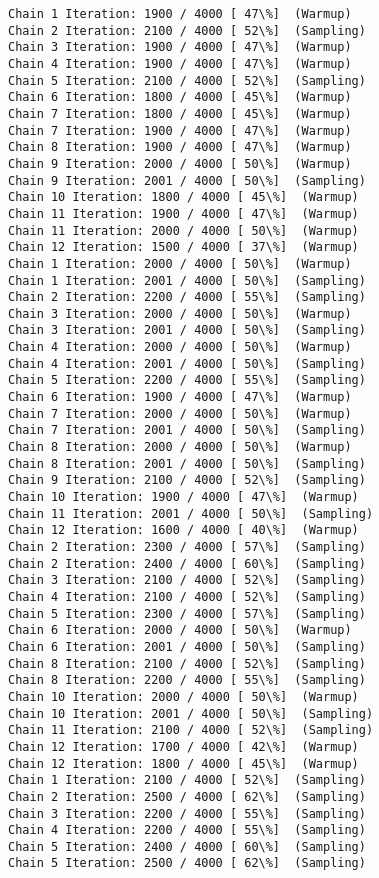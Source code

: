 \documentclass[11pt]{article}
\begin{document}
\begin{Verbatim}[commandchars=\\\{\}]
Chain 1 Iteration: 1900 / 4000 [ 47\%]  (Warmup)
Chain 2 Iteration: 2100 / 4000 [ 52\%]  (Sampling)
Chain 3 Iteration: 1900 / 4000 [ 47\%]  (Warmup)
Chain 4 Iteration: 1900 / 4000 [ 47\%]  (Warmup)
Chain 5 Iteration: 2100 / 4000 [ 52\%]  (Sampling)
Chain 6 Iteration: 1800 / 4000 [ 45\%]  (Warmup)
Chain 7 Iteration: 1800 / 4000 [ 45\%]  (Warmup)
Chain 7 Iteration: 1900 / 4000 [ 47\%]  (Warmup)
Chain 8 Iteration: 1900 / 4000 [ 47\%]  (Warmup)
Chain 9 Iteration: 2000 / 4000 [ 50\%]  (Warmup)
Chain 9 Iteration: 2001 / 4000 [ 50\%]  (Sampling)
Chain 10 Iteration: 1800 / 4000 [ 45\%]  (Warmup)
Chain 11 Iteration: 1900 / 4000 [ 47\%]  (Warmup)
Chain 11 Iteration: 2000 / 4000 [ 50\%]  (Warmup)
Chain 12 Iteration: 1500 / 4000 [ 37\%]  (Warmup)
Chain 1 Iteration: 2000 / 4000 [ 50\%]  (Warmup)
Chain 1 Iteration: 2001 / 4000 [ 50\%]  (Sampling)
Chain 2 Iteration: 2200 / 4000 [ 55\%]  (Sampling)
Chain 3 Iteration: 2000 / 4000 [ 50\%]  (Warmup)
Chain 3 Iteration: 2001 / 4000 [ 50\%]  (Sampling)
Chain 4 Iteration: 2000 / 4000 [ 50\%]  (Warmup)
Chain 4 Iteration: 2001 / 4000 [ 50\%]  (Sampling)
Chain 5 Iteration: 2200 / 4000 [ 55\%]  (Sampling)
Chain 6 Iteration: 1900 / 4000 [ 47\%]  (Warmup)
Chain 7 Iteration: 2000 / 4000 [ 50\%]  (Warmup)
Chain 7 Iteration: 2001 / 4000 [ 50\%]  (Sampling)
Chain 8 Iteration: 2000 / 4000 [ 50\%]  (Warmup)
Chain 8 Iteration: 2001 / 4000 [ 50\%]  (Sampling)
Chain 9 Iteration: 2100 / 4000 [ 52\%]  (Sampling)
Chain 10 Iteration: 1900 / 4000 [ 47\%]  (Warmup)
Chain 11 Iteration: 2001 / 4000 [ 50\%]  (Sampling)
Chain 12 Iteration: 1600 / 4000 [ 40\%]  (Warmup)
Chain 2 Iteration: 2300 / 4000 [ 57\%]  (Sampling)
Chain 2 Iteration: 2400 / 4000 [ 60\%]  (Sampling)
Chain 3 Iteration: 2100 / 4000 [ 52\%]  (Sampling)
Chain 4 Iteration: 2100 / 4000 [ 52\%]  (Sampling)
Chain 5 Iteration: 2300 / 4000 [ 57\%]  (Sampling)
Chain 6 Iteration: 2000 / 4000 [ 50\%]  (Warmup)
Chain 6 Iteration: 2001 / 4000 [ 50\%]  (Sampling)
Chain 8 Iteration: 2100 / 4000 [ 52\%]  (Sampling)
Chain 8 Iteration: 2200 / 4000 [ 55\%]  (Sampling)
Chain 10 Iteration: 2000 / 4000 [ 50\%]  (Warmup)
Chain 10 Iteration: 2001 / 4000 [ 50\%]  (Sampling)
Chain 11 Iteration: 2100 / 4000 [ 52\%]  (Sampling)
Chain 12 Iteration: 1700 / 4000 [ 42\%]  (Warmup)
Chain 12 Iteration: 1800 / 4000 [ 45\%]  (Warmup)
Chain 1 Iteration: 2100 / 4000 [ 52\%]  (Sampling)
Chain 2 Iteration: 2500 / 4000 [ 62\%]  (Sampling)
Chain 3 Iteration: 2200 / 4000 [ 55\%]  (Sampling)
Chain 4 Iteration: 2200 / 4000 [ 55\%]  (Sampling)
Chain 5 Iteration: 2400 / 4000 [ 60\%]  (Sampling)
Chain 5 Iteration: 2500 / 4000 [ 62\%]  (Sampling)

\end{Verbatim}
\end{document}
